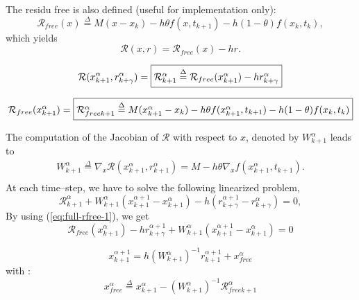 The residu free is also defined (useful for implementation only):
\[\mathcal R _{free}(x) \stackrel{\Delta}{=}  M(x - x_{k}) -h\theta f( x , t_{k+1}) - h(1-\theta)f(x_k,t_k),\]
which yields
\[\mathcal R (x,r) = \mathcal R _{free}(x)   - h r .\]

\begin{equation}
  \mathcal R (x^{\alpha}_{k+1},r^{\alpha}_{k+\gamma}) = \fbox{$\mathcal R^{\alpha}_{k+1} \stackrel{\Delta}{=}  \mathcal R_{free}(x^{\alpha}_{k+1} )  - h r^{\alpha}_{k+\gamma}$}\label{eq:full-rfree-1}
\end{equation}

\[  \mathcal R
_{free}(x^{\alpha}_{k+1} )=\fbox{$ \mathcal R _{free k+1} ^{\alpha} \stackrel{\Delta}{=}  M(x^{\alpha}_{k+1} - x_{k}) -h\theta f( x^{\alpha}_{k+1} , t_{k+1}) - h(1-\theta)f(x_k,t_k)$}\]
 
The computation of the Jacobian of $\mathcal R$ with respect to $x$, denoted by $   W^{\alpha}_{k+1}$ leads to 
\begin{equation}
   \label{eq:full-NL9}
   \begin{array}{l}
    W^{\alpha}_{k+1} \stackrel{\Delta}{=} \nabla_{x} \mathcal R (x^{\alpha}_{k+1},r^{\alpha}_{k+1})= M - h  \theta \nabla_{x} f(  x^{\alpha}_{k+1}, t_{k+1} ).\\
 \end{array}
\end{equation}
At each time--step, we have to solve the following linearized problem,
\begin{equation}
   \label{eq:full-NL10}
    \mathcal R^{\alpha}_{k+1} + W^{\alpha}_{k+1} (x^{\alpha+1}_{k+1} -
    x^{\alpha}_{k+1}) - h  (r^{\alpha+1}_{k+\gamma} - r^{\alpha}_{k+\gamma} )  =0 ,
\end{equation}
By using (\ref{eq:full-rfree-1}), we get
\begin{equation}
  \label{eq:full-rfree-2}
  \mathcal R _{free}(x^{\alpha}_{k+1})  - h  r^{\alpha+1}_{k+\gamma}   + W^{\alpha}_{k+1} (x^{\alpha+1}_{k+1} -
    x^{\alpha}_{k+1})  =0 
\end{equation}

{
  \begin{equation}
    \boxed{ x^{\alpha+1}_{k+1} = h(W^{\alpha}_{k+1})^{-1}r^{\alpha+1}_{k+1} +x^\alpha_{free}}
  \end{equation}
}
with :
\begin{equation}
  \boxed{x^\alpha_{free}\stackrel{\Delta}{=}x^{\alpha}_{k+1}-(W^{\alpha}_{k+1})^{-1}\mathcal R_{freek+1}^{\alpha} \label{eq:full-rfree-12}}
\end{equation}

